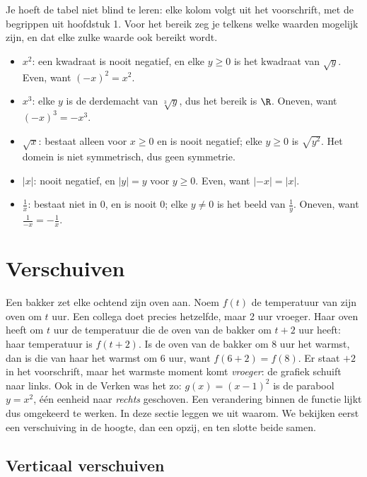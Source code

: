 Je hoeft de tabel niet blind te leren: elke kolom volgt uit het voorschrift, met de begrippen uit hoofdstuk 1. Voor het bereik zeg je telkens welke waarden mogelijk zijn, en dat elke zulke waarde ook bereikt wordt.

\begin{itemize}
\item $x^2$: een kwadraat is nooit negatief, en elke $y \geqslant 0$ is het kwadraat van $\sqrt{y}$. Even, want $(-x)^2 = x^2$.
\item $x^3$: elke $y$ is de derdemacht van $\sqrt[3]{y}$, dus het bereik is $\R$. Oneven, want $(-x)^3 = -x^3$.
\item $\sqrt{x}$: bestaat alleen voor $x \geqslant 0$ en is nooit negatief; elke $y \geqslant 0$ is $\sqrt{y^2}$. Het domein is niet symmetrisch, dus geen symmetrie.
\item $|x|$: nooit negatief, en $|y| = y$ voor $y \geqslant 0$. Even, want $|-x| = |x|$.
\item $\frac1x$: bestaat niet in $0$, en is nooit $0$; elke $y \neq 0$ is het beeld van $\frac1y$. Oneven, want $\frac{1}{-x} = -\frac1x$.
\end{itemize}

\begin{oefeningen}
\end{oefeningen}

\section{Verschuiven}

Een bakker zet elke ochtend zijn oven aan. Noem $f(t)$ de temperatuur van zijn oven om $t$ uur. Een collega doet precies hetzelfde, maar 2 uur vroeger. Haar oven heeft om $t$ uur de temperatuur die de oven van de bakker om $t + 2$ uur heeft: haar temperatuur is $f(t + 2)$. Is de oven van de bakker om 8 uur het warmst, dan is die van haar het warmst om 6 uur, want $f(6 + 2) = f(8)$. Er staat $+2$ in het voorschrift, maar het warmste moment komt \textit{vroeger}: de grafiek schuift naar links. Ook in de Verken was het zo: $g(x) = (x - 1)^2$ is de parabool $y = x^2$, één eenheid naar \textit{rechts} geschoven. Een verandering binnen de functie lijkt dus omgekeerd te werken. In deze sectie leggen we uit waarom. We bekijken eerst een verschuiving in de hoogte, dan een opzij, en ten slotte beide samen.

\subsection{Verticaal verschuiven}

